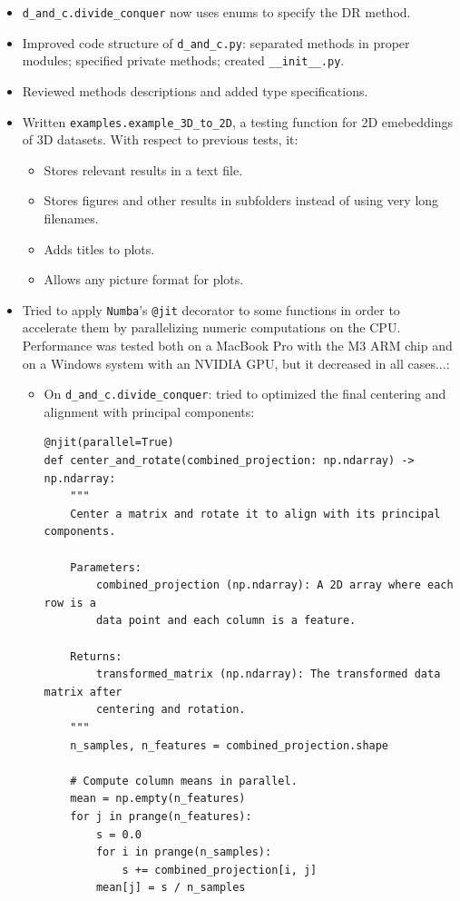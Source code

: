 \documentclass[a4paper,12pt]{article}
\begin{document}
\begin{itemize}
    \item \verb|d_and_c.divide_conquer| now uses enums to specify the DR method.
    \item Improved code structure of \verb|d_and_c.py|: separated methods in proper modules; specified private methods; created \verb|__init__.py|.
    \item Reviewed methods descriptions and added type specifications.
    \item Written \verb|examples.example_3D_to_2D|, a testing function for 2D emebeddings of 3D datasets. With respect to previous tests, it:
    \begin{itemize}
        \item Stores relevant results in a text file.
        \item Stores figures and other results in subfolders instead of using very long filenames.
        \item Adds titles to plots.
        \item Allows any picture format for plots.
    \end{itemize}
    \item Tried to apply \texttt{Numba}'s \verb|@jit| decorator to some functions in order to accelerate them by parallelizing numeric computations on the CPU. Performance was tested both on a MacBook Pro with the M3 ARM chip and on a Windows system with an NVIDIA GPU, but it decreased in all cases...:
    \begin{itemize}
        \item On \verb|d_and_c.divide_conquer|: tried to optimized the final centering and alignment with principal components:
        \begin{verbatim}
@njit(parallel=True)
def center_and_rotate(combined_projection: np.ndarray) -> np.ndarray:
    """
    Center a matrix and rotate it to align with its principal components.

    Parameters:
        combined_projection (np.ndarray): A 2D array where each row is a
        data point and each column is a feature.

    Returns:
        transformed_matrix (np.ndarray): The transformed data matrix after
        centering and rotation.
    """
    n_samples, n_features = combined_projection.shape

    # Compute column means in parallel.
    mean = np.empty(n_features)
    for j in prange(n_features):
        s = 0.0
        for i in prange(n_samples):
            s += combined_projection[i, j]
        mean[j] = s / n_samples


\end{verbatim}
\end{itemize}
\end{itemize}
\end{document}
